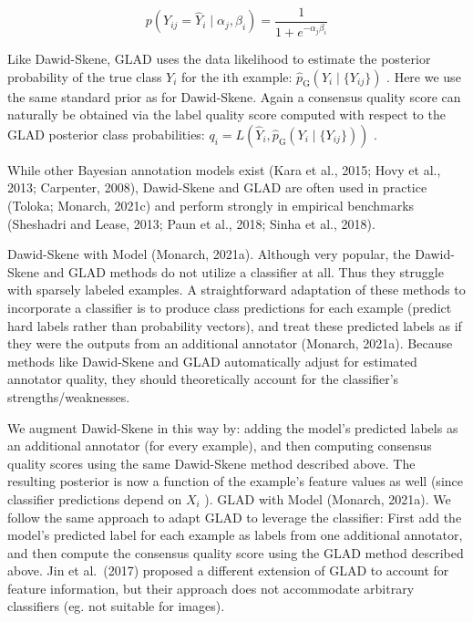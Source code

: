 \documentclass[
]{article}
\begin{document}
\[
p \left(Y _ {i j} = \widehat {Y} _ {i} \mid \alpha_ {j}, \beta_ {i}\right) = \frac {1}{1 + e ^ {- \alpha_ {j} \beta_ {i}}} \tag {16}
\]

Like Dawid-Skene, GLAD uses the data likelihood to estimate the
posterior probability of the true class \(Y_{i}\) for the ith example:
\(\widehat{p}_{\mathrm{G}}(Y_{i} \mid \{Y_{ij}\})\) . Here we use the
same standard prior as for Dawid-Skene. Again a consensus quality score
can naturally be obtained via the label quality score computed with
respect to the GLAD posterior class probabilities:
\(q_{i} = L(\widehat{Y}_{i}, \widehat{p}_{\mathrm{G}}(Y_{i} \mid \{Y_{ij}\}))\)
.

While other Bayesian annotation models exist (Kara et al., 2015; Hovy et
al., 2013; Carpenter, 2008), Dawid-Skene and GLAD are often used in
practice (Toloka; Monarch, 2021c) and perform strongly in empirical
benchmarks (Sheshadri and Lease, 2013; Paun et al., 2018; Sinha et al.,
2018).

Dawid-Skene with Model (Monarch, 2021a). Although very popular, the
Dawid-Skene and GLAD methods do not utilize a classifier at all. Thus
they struggle with sparsely labeled examples. A straightforward
adaptation of these methods to incorporate a classifier is to produce
class predictions for each example (predict hard labels rather than
probability vectors), and treat these predicted labels as if they were
the outputs from an additional annotator (Monarch, 2021a). Because
methods like Dawid-Skene and GLAD automatically adjust for estimated
annotator quality, they should theoretically account for the
classifier's strengths/weaknesses.

We augment Dawid-Skene in this way by: adding the model's predicted
labels as an additional annotator (for every example), and then
computing consensus quality scores using the same Dawid-Skene method
described above. The resulting posterior is now a function of the
example's feature values as well (since classifier predictions depend on
\(X_{i}\) ). GLAD with Model (Monarch, 2021a). We follow the same
approach to adapt GLAD to leverage the classifier: First add the model's
predicted label for each example as labels from one additional
annotator, and then compute the consensus quality score using the GLAD
method described above. Jin et al.~(2017) proposed a different extension
of GLAD to account for feature information, but their approach does not
accommodate arbitrary classifiers (eg. not suitable for images).
\end{document}
